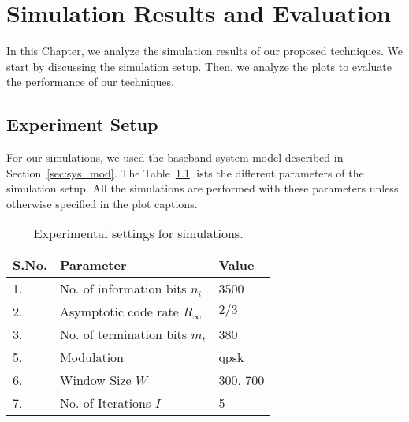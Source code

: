 \chapter{Simulation Results and Evaluation}\label{ch:simulation}
In this Chapter, we analyze the simulation results of our proposed techniques. We start by discussing the simulation setup. Then, we analyze the plots to evaluate the performance of our techniques.

\section{Experiment Setup}
For our simulations, we used the baseband system model described in Section~\ref{sec:sys_mod}. The Table~\ref{tab:sim_param} lists the different parameters of the simulation setup. All the simulations are performed with these parameters unless otherwise specified in the plot captions.
\begin{table}[htbp]
\centering
\begin{tabular}{|l|l|l|}
  \hline
  \textbf{S.No.} &\textbf{Parameter} &\textbf{Value}\\
  \hline
  \hline
  1. &No. of information bits $n_i$ &3500\\
  \hline
  2. &Asymptotic code rate $R_\infty$ &$2/3$\\
  \hline
  3. &No. of termination bits $m_t$ &380\\
  \hline
  5. &Modulation &\gls{qpsk}\\
  \hline
  6. &Window Size $W$ &300, 700\\
  \hline
  7. &No. of Iterations $I$ &5\\
  \hline
\end{tabular}
\caption{Experimental settings for simulations.}
\label{tab:sim_param}
\end{table}

